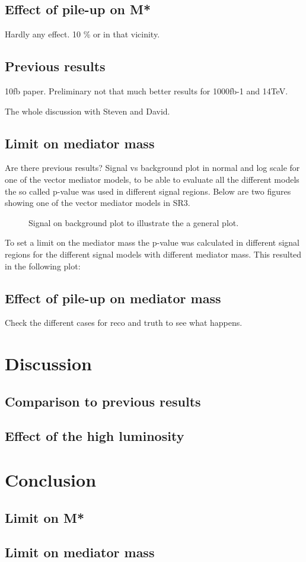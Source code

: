 \subsection{Effect of pile-up on M*}
Hardly any effect. 10 \% or in that vicinity.

\subsection{Previous results}
10fb paper.
Preliminary not that much better results for 1000fb-1 and 14TeV.

The whole discussion with Steven and David.


\subsection{Limit on mediator mass}\label{sec:res:subsec:Mm}
Are there previous results?
Signal vs background plot in normal and log scale for one of the vector mediator models, to be able to evaluate all the different models the so called p-value was used in different signal regions. Below are two figures showing one of the vector mediator models in SR3.
 \begin{figure}[H] %
    \hfill
    \caption{Signal on background plot to illustrate the a general plot. }
    \label{fig:sigback}
  \end{figure}

To set a limit on the mediator mass the p-value was calculated in different signal regions for the different signal models with different mediator mass. This resulted in the following plot:


\subsection{Effect of pile-up on mediator mass}
Check the different cases for reco and truth to see what happens.
\newpage
\section{Discussion}
\subsection{Comparison to previous results}
\subsection{Effect of the high luminosity}
\newpage
\section{Conclusion}
\subsection{Limit on M*}
\subsection{Limit on mediator mass}